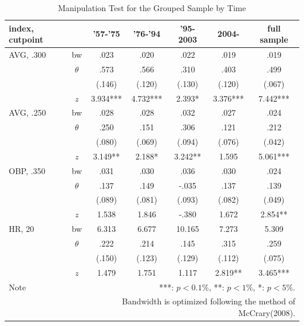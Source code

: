 \documentclass[dvipdfmx,12pt]{beamer}
\begin{document}
\begin{frame}
  \begin{table}
    \centering
    \caption{Manipulation Test for the Grouped Sample by Time}
    \label{Mani-Era}
    \tiny
    \begin{tabular}{lcccccc} \hline
      index, cutpoint &  & '57-'75 &'76-'94 & '95-2003 & 2004- &full sample \\ \hline \hline
      AVG, .300 & bw & .023 & .020 & .022 & .019 & .019 \\
      & $\theta$ & .573 & .566 & .310 & .403 & .499 \\
      & & (.146) & (.120) & (.130) & (.120) & (.067) \\
      & $z$ & 3.934*** & 4.732*** & 2.393* & 3.376*** & 7.442*** \\ \hline
      AVG, .250 & bw & .028 & .028 & .032 & .027 & .024 \\
      & $\theta$ & .250 & .151 & .306 & .121 & .212 \\
      & & (.080) & (.069) & (.094)& (.076) & (.042) \\
      & $z$ & 3.149** & 2.188* & 3.242** & 1.595 & 5.061*** \\ \hline
      OBP, .350 & bw & .031 & .030 & .036 & .030 & .024 \\
      & $\theta$ & .137 & .149 & -.035 & .137 & .139 \\
      & & (.089) & (.081) & (.093) & (.082) & (.049) \\
      & $z$ & 1.538 & 1.846 & -.380 & 1.672 & 2.854** \\ \hline
      HR, 20 & bw & 6.313 & 6.677 & 10.165 & 7.273 & 5.309 \\
      & $\theta$ & .222 & .214 & .145 & .315 & .259 \\
      & & (.150) & (.123) & (.129) & (.112) & (.075) \\
      & $z$ & 1.479 & 1.751 & 1.117 & 2.819** & 3.465*** \\ \hline
      Note & \multicolumn{6}{r}{
      ***: $p<0.1\%$, **: $p<1\%$, *: $p<5\%$.
      }\\
      & \multicolumn{6}{r}{
      Bandwidth is optimized following the method of McCrary(2008).
      }
    \end{tabular}
  \end{table}

\end{frame}
\end{document}
